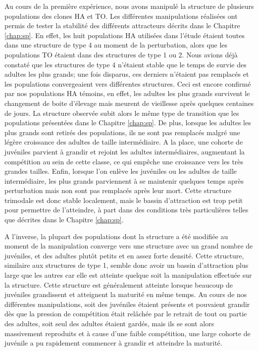 Au cours de la première expérience, nous avons manipulé la structure de
plusieurs populations des clones HA et TO. Les différentes manipulations
réalisées ont permis de tester la stabilité des différents attracteurs décrits
dans le Chapitre \ref{chap:sp}. En effet, les huit populations HA utilisées
dans l'étude étaient toutes dans une structure de type 4 au moment de la
perturbation, alors que les populations TO étaient dans des structures de type 1
ou 2. Nous avions déjà constaté que les structures de type 4 n'étaient stable
que le temps de survie des adultes les plus grands; une fois disparus,
ces derniers n'étaient pas remplacés et les populations convergeaient vers
différentes structures. Ceci est encore confirmé par nos populations HA témoins,
en effet, les adultes les plus grands survivent le changement de boite d'élevage
mais meurent de vieillesse après quelques centaines de jours. La structure
observée subit alors le même type de transition que les populations présentées
dans le Chapitre \ref{chap:sp}. De plus, lorsque les adultes les plus grands
sont retirés des populations, ils ne sont pas remplacés malgré une légère
croissance des adultes de taille intermédiaire. A la place, une cohorte de
juvéniles parvient à grandir et rejoint les adultes intermédiaires, augmentant
la compétition au sein de cette classe, ce qui empêche une croissance vers les
très grandes tailles. Enfin, lorsque l'on enlève les juvéniles ou les adultes
de taille intermédiaire, les plus grands parviennent à se maintenir quelques
temps après perturbation mais non sont pas remplacés après leur mort. Cette
structure trimodale est donc stable localement, mais le bassin d'attraction est
trop petit pour permettre de l'atteindre, à part dans des conditions très
particulières telles que décrites dans le Chapitre \ref{chap:sp}.

A l'inverse, la plupart des populations dont la structure a été modifiée au
moment de la manipulation converge vers une structure avec un grand nombre de
juvéniles, et des adultes plutôt petits et en assez forte densité. Cette
structure, similaire aux structures de type 1, semble donc avoir un bassin
d'attraction plus large que les autres car elle est atteinte quelque soit la
manipulation effectuée sur la structure. Cette structure est généralement
atteinte lorsque beaucoup de juvéniles grandissent et atteignent la maturité en
même temps. Au cours de nos différentes manipulations, soit des juvéniles
étaient présents et pouvaient grandir dès que la pression de compétition était
relâchée par le retrait de tout ou partie des adultes, soit seul des adultes
étaient gardés, mais ils se sont alors massivement reproduits et à cause d'une
faible compétition, une large cohorte de juvénile a pu rapidement commencer à
grandir et atteindre la maturité. 

